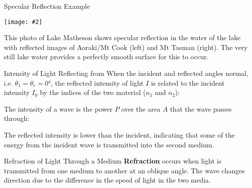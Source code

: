 \documentclass[12pt,compress,aspectratio=169]{beamer}
\newcommand{\pic}[2]{\texttt{[image: \#2]}}
\newcommand{\eq}[2]{\vspace{#1}{\LARGE\begin{displaymath}#2\end{displaymath}}}
\begin{document}
\begin{frame}{Specular Reflection Example}
  \begin{center}
    \pic{.55}{graphics/Lake-reflection}
  \end{center}
  This photo of Lake Matheson shows specular reflection in the water of the
  lake with reflected images of Aoraki/Mt Cook (left) and Mt Tasman (right).
  The very still lake water provides a perfectly smooth surface for this to
  occur.
\end{frame}


\begin{frame}{Intensity of Light Reflecting from}
  When the incident and reflected angles normal, i.e.
  $\theta_1=\theta_r=\ang{0}$, the reflected intensity of light $I$ is related
  to the incident intensity $I_0$ by the indices of the two material ($n_1$ and
  $n_2$):

  \eq{-.3in}{
    I=\left(\frac{n_1-n_2}{n_1+n_2}\right)^2 I_0
  }
  
  The intensity of a wave is the power $P$ over the area $A$ that the wave
  passes through:

  \eq{-.3in}{
    I=\frac{P}A
  }

  The reflected intensity is lower than the incident, indicating that some of
  the energy from the incident wave is transmitted into the second medium.
\end{frame}



\begin{frame}{Refraction of Light Through a Medium}
  \textbf{Refraction} occurs when light is transmitted from one medium to
  another at an oblique angle. The wave changes direction due to the difference
  in the speed of light in the two media.
  \begin{center}
  \end{center}
\end{frame}
\end{document}

